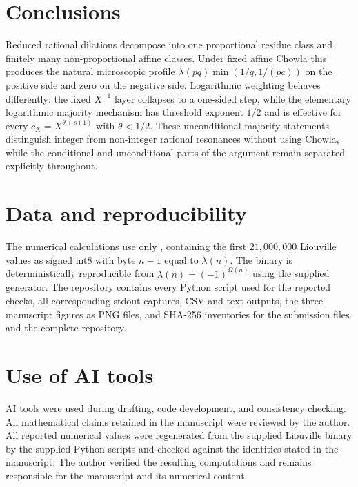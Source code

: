 \documentclass[preprint,12pt]{elsarticle}
\numberwithin{equation}{section}
\theoremstyle{plain}
\theoremstyle{definition}
\theoremstyle{remark}
\begin{document}
\section{Conclusions}
\label{sec:conclusions}

Reduced rational dilations decompose into one proportional residue class and
finitely many non-proportional affine classes. Under fixed affine Chowla this
produces the natural microscopic profile
$\lambda(pq)\min(1/q,1/(pc))$ on the positive side and zero on the negative
side. Logarithmic weighting behaves differently: the fixed $X^{-1}$ layer
collapses to a one-sided step, while the elementary logarithmic majority mechanism has threshold
exponent $1/2$ and is effective for every
$c_X=X^{\theta+o(1)}$ with $\theta<1/2$. These unconditional majority
statements distinguish integer from non-integer rational resonances without
using Chowla, while the conditional and unconditional parts of the argument
remain separated explicitly throughout.

\section{Data and reproducibility}
\label{sec:data}

The numerical calculations use only
, containing the first $21{,}000{,}000$
Liouville values as signed int8 with byte $n-1$ equal to $\lambda(n)$. The
binary is deterministically reproducible from
$\lambda(n)=(-1)^{\Omega(n)}$ using the supplied generator. The repository
contains every Python script used for the reported checks, all corresponding
stdout captures, CSV and text outputs, the three manuscript figures as PNG
files, and SHA-256 inventories for the submission files and the complete
repository.

\section{Use of AI tools}
\label{sec:ai}

AI tools were used during drafting, code development, and consistency
checking. All mathematical claims retained in the manuscript were reviewed by
the author. All reported numerical values were regenerated from the supplied
Liouville binary by the supplied Python scripts and checked against the
identities stated in the manuscript. The author verified the resulting
computations and remains responsible for the manuscript and its numerical
content.
\end{document}
